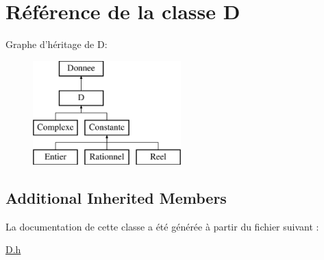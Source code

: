 \hypertarget{class_d}{\section{Référence de la classe D}
\label{class_d}
}
Graphe d'héritage de D\-:\begin{figure}[H]
\begin{center}
\leavevmode
\includegraphics[height=4.000000cm]{class_d}
\end{center}
\end{figure}
\subsection*{Additional Inherited Members}


La documentation de cette classe a été générée à partir du fichier suivant \-:\begin{DoxyCompactItemize}
\item 
\hyperlink{_d_8h}{D.\-h}\end{DoxyCompactItemize}
